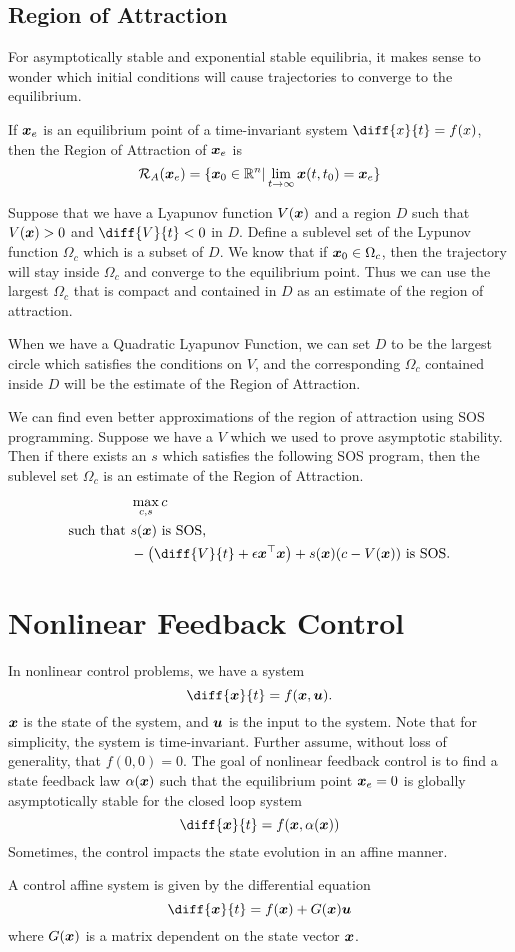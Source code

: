 \subsection{Region of Attraction}
For asymptotically stable and exponential stable equilibria, it makes sense to
wonder which initial conditions will cause trajectories to converge to the
equilibrium.
\begin{definition}
	If $\boldsymbol{x}_e$ is an equilibrium point of a time-invariant system $\diff{x}{t}
	= f(x)$, then the Region of Attraction of $\boldsymbol{x}_e$ is \[
		\mathcal{R}_A(\boldsymbol{x}_e) = \{ \boldsymbol{x}_0 \in \mathbb{R}^n | \lim_{t\to\infty}
		\boldsymbol{x}(t, t_0) = \boldsymbol{x}_e \}
	\]
	\label{defn:region-of-attraction}
\end{definition}
Suppose that we have a Lyapunov function $V(\boldsymbol{x})$ and a region $D$ such that
$V(\boldsymbol{x}) > 0$ and $\diff{V}{t} < 0$ in $D$. Define a sublevel set of the
Lypunov function $\Omega_c$ which is a subset of $D$. We know that if
$\boldsymbol{x}_0\in\Omega_c$, then the trajectory will stay inside $\Omega_c$ and
converge to the equilibrium point. Thus we can use the largest $\Omega_c$ that
is compact and contained in $D$ as an estimate of the region of attraction.

When we have a Quadratic Lyapunov Function, we can set $D$ to be the largest
circle which satisfies the conditions on $V$, and the corresponding $\Omega_c$
contained inside $D$ will be the estimate of the Region of Attraction.

We can find even better approximations of the region of attraction using SOS
programming. Suppose we have a $V$ which we used to prove asymptotic stability.
Then if there exists an $s$ which satisfies the following SOS program, then the
sublevel set $\Omega_c$ is an estimate of the Region of Attraction.
\begin{align*}
	&\max_{c, s} c\\
	\text{such that } &s(\bs{x}) \text{ is SOS,}\\
	& -\left(\diff{V}{t} + \epsilon \bs{x}^\top \bs{x}\right) + s(\bs{x})(c -
	V(\bs{x})) \text{ is SOS.}
\end{align*}
\section{Nonlinear Feedback Control}
In nonlinear control problems, we have a system \[
	\diff{\bs{x}}{t} = f(\bs{x}, \bs{u}).
\]
$\boldsymbol{x}$ is the state of the system, and $\boldsymbol{u}$ is the input to the system.
Note that for simplicity, the system is time-invariant. Further assume, without
loss of generality, that $f(0, 0) = 0$. The goal of nonlinear feedback control
is to find a state feedback law $\alpha(\boldsymbol{x})$ such that the equilibrium point
$\boldsymbol{x}_e = 0$ is globally asymptotically stable for the closed loop system \[
	\diff{\bs{x}}{t} = f(\bs{x}, \alpha(\bs{x}))
\]
Sometimes, the control impacts the state evolution in an affine manner.
\begin{definition}
	A control affine system is given by the differential equation \[
		\diff{\bs{x}}{t} = f(\bs{x}) + G(\bs{x})\bs{u}
	\] where $G(\boldsymbol{x})$ is a matrix dependent on the state vector $\boldsymbol{x}$.
	\label{defn:control-affine}
\end{definition}

